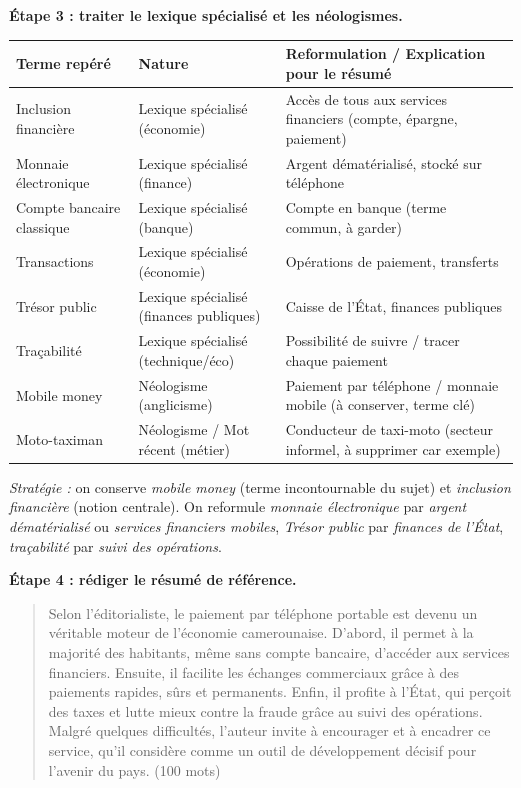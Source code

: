 \documentclass[11pt]{article}
\begin{document}
\begin{exoresolu}
\textbf{Étape 3 : traiter le lexique spécialisé et les néologismes.}

\begin{center}
\begin{tabularx}{\linewidth}{|l|l|X|}
\hline
\rowcolor{popblueL} \textbf{Terme repéré} & \textbf{Nature} & \textbf{Reformulation / Explication pour le résumé} \\
\hline
Inclusion financière & Lexique spécialisé (économie) & Accès de tous aux services financiers (compte, épargne, paiement) \\
\hline
Monnaie électronique & Lexique spécialisé (finance) & Argent dématérialisé, stocké sur téléphone \\
\hline
Compte bancaire classique & Lexique spécialisé (banque) & Compte en banque (terme commun, à garder) \\
\hline
Transactions & Lexique spécialisé (économie) & Opérations de paiement, transferts \\
\hline
Trésor public & Lexique spécialisé (finances publiques) & Caisse de l'État, finances publiques \\
\hline
Traçabilité & Lexique spécialisé (technique/éco) & Possibilité de suivre / tracer chaque paiement \\
\hline
Mobile money & Néologisme (anglicisme) & Paiement par téléphone / monnaie mobile (à conserver, terme clé) \\
\hline
Moto-taximan & Néologisme / Mot récent (métier) & Conducteur de taxi-moto (secteur informel, à supprimer car exemple) \\
\hline
\end{tabularx}
\end{center}
\textit{Stratégie :} on conserve \emph{mobile money} (terme incontournable du sujet) et \emph{inclusion financière} (notion centrale). On reformule \emph{monnaie électronique} par \emph{argent dématérialisé} ou \emph{services financiers mobiles}, \emph{Trésor public} par \emph{finances de l'État}, \emph{traçabilité} par \emph{suivi des opérations}.

\textbf{Étape 4 : rédiger le résumé de référence.}

\begin{quote}
Selon l'éditorialiste, le paiement par téléphone portable est devenu un véritable moteur de l'économie camerounaise. D'abord, il permet à la majorité des habitants, même sans compte bancaire, d'accéder aux services financiers. Ensuite, il facilite les échanges commerciaux grâce à des paiements rapides, sûrs et permanents. Enfin, il profite à l'État, qui perçoit des taxes et lutte mieux contre la fraude grâce au suivi des opérations. Malgré quelques difficultés, l'auteur invite à encourager et à encadrer ce service, qu'il considère comme un outil de développement décisif pour l'avenir du pays. (100 mots)
\end{quote}


\end{exoresolu}
\end{document}
